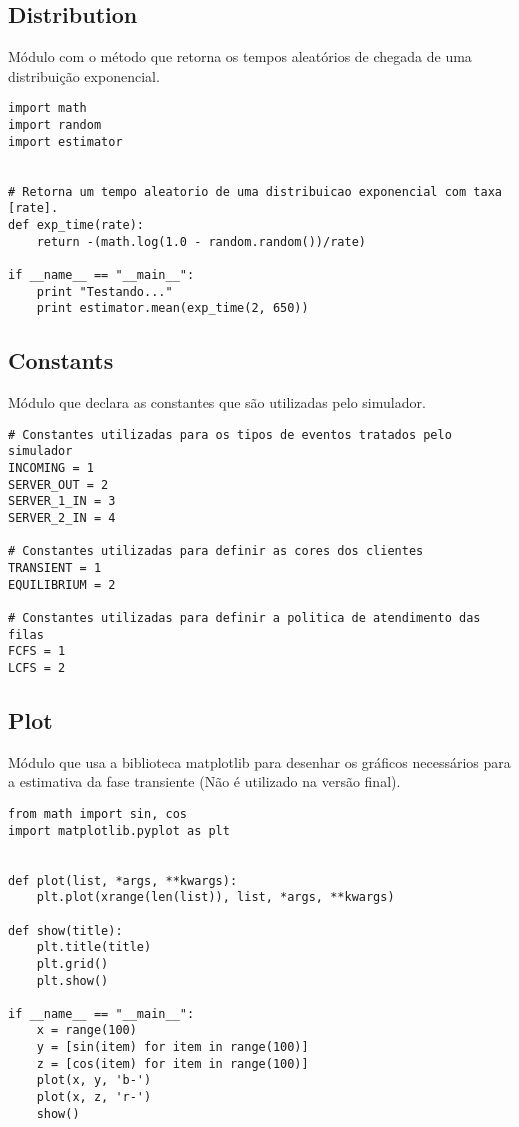 \subsection{Distribution}
Módulo com o método que retorna os tempos aleatórios de chegada de uma distribuição exponencial.\\

\begin{lstlisting}
import math
import random
import estimator


# Retorna um tempo aleatorio de uma distribuicao exponencial com taxa [rate].
def exp_time(rate):
	return -(math.log(1.0 - random.random())/rate)
	
if __name__ == "__main__":
	print "Testando..."
	print estimator.mean(exp_time(2, 650))
\end{lstlisting}

\subsection{Constants}
Módulo que declara as constantes que são utilizadas pelo simulador.\\

\begin{lstlisting}
# Constantes utilizadas para os tipos de eventos tratados pelo simulador
INCOMING = 1
SERVER_OUT = 2
SERVER_1_IN = 3
SERVER_2_IN = 4

# Constantes utilizadas para definir as cores dos clientes
TRANSIENT = 1
EQUILIBRIUM = 2

# Constantes utilizadas para definir a politica de atendimento das filas
FCFS = 1
LCFS = 2
\end{lstlisting}

\subsection{Plot}
Módulo que usa a biblioteca matplotlib para desenhar os gráficos necessários para a estimativa da fase transiente (Não é utilizado na versão final).\\

\begin{lstlisting}
from math import sin, cos
import matplotlib.pyplot as plt


def plot(list, *args, **kwargs):
    plt.plot(xrange(len(list)), list, *args, **kwargs)

def show(title):
    plt.title(title)
    plt.grid()
    plt.show()

if __name__ == "__main__":
    x = range(100)
    y = [sin(item) for item in range(100)]
    z = [cos(item) for item in range(100)]
    plot(x, y, 'b-')
    plot(x, z, 'r-')
    show()
\end{lstlisting}

